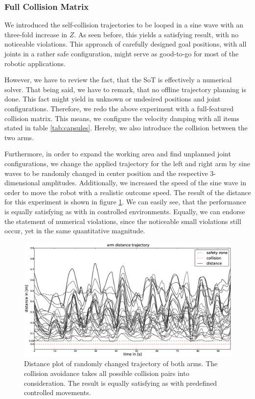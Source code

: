\subsubsection*{Full Collision Matrix}
We introduced the self-collision trajectories to be looped in a sine wave with an three-fold increase in $Z$. As seen before, this yields a satisfying result, with no noticeable violations. This approach of carefully designed goal positions, with all joints in a rather safe configuration, might serve as good-to-go for most of the robotic applications.

However, we have to review the fact, that the SoT is effectively a numerical solver. That being said, we have to remark, that no offline trajectory planning is done. This fact might yield in unknown or undesired positions and joint configurations. 
Therefore, we redo the above experiment with a full-featured collision matrix. This means, we configure the velocity damping with all items stated in table \ref{tab:capsules}. Hereby, we also introduce the collision between the two arms. 

Furthermore, in order to expand the working area and find unplanned joint configurations, we change the applied trajectory for the left and right arm by sine waves to be randomly changed in center position and the respective 3-dimensional amplitudes. Additionally, we increased the speed of the sine wave in order to move the robot with a realistic outcome speed.
The result of the distance for this experiment is shown in figure \ref{fig:selfcollisiondistancefull}. We can easily see, that the performance is equally satisfying as with in controlled environments. Equally, we can endorse the statement of numerical violations, since the noticeable small violations still occur, yet in the same quantitative magnitude. 
\begin{figure}[h!]
  \centering
    \includegraphics[width=\textwidth]{../figures/full/distance.eps}
    \caption{Distance plot of randomly changed trajectory of both arms. The collision avoidance takes all possible collision pairs into consideration. The result is equally satisfying as with predefined controlled movements.}
    \label{fig:selfcollisiondistancefull}
\end{figure}

